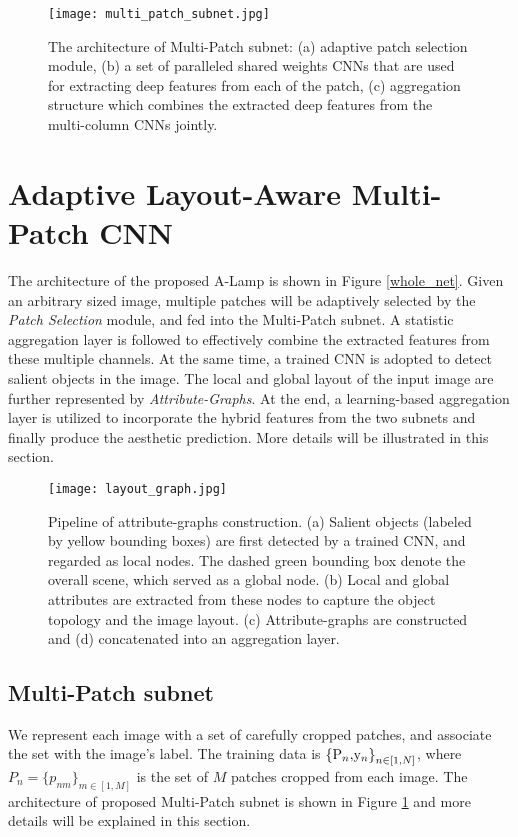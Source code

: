 \documentclass[10pt,twocolumn,letterpaper]{article}
\begin{document}
\begin{figure}
		\centering
		\texttt{[image: multi\_patch\_subnet.jpg]}
		\caption{The architecture of Multi-Patch subnet: (a) adaptive patch selection module, (b) a set of paralleled shared weights CNNs that are used for extracting deep features from each of the patch, (c) aggregation structure which combines the extracted deep features from the multi-column CNNs jointly.}
		\label{multi_patch}
		\vspace{-3mm}
	\end{figure} 
\section{Adaptive Layout-Aware Multi-Patch CNN}
	The architecture of the proposed A-Lamp is shown in Figure \ref{whole_net}. Given an arbitrary sized image, multiple patches will be adaptively selected by the \textit{Patch Selection} module, and fed into the Multi-Patch subnet. A statistic aggregation layer is followed to effectively combine the extracted features from these multiple channels.
	At the same time, a trained CNN is adopted to detect salient objects in the image. The local and global layout of the input image are further represented by \textit{Attribute-Graphs}. At the end, a learning-based aggregation layer is utilized to incorporate the hybrid features from the two subnets and finally produce the aesthetic prediction. More details will be illustrated in this section. 
	\begin{figure*}
		\centering
		\texttt{[image: layout\_graph.jpg]}
		\caption{Pipeline of attribute-graphs construction. (a) Salient objects (labeled by yellow bounding boxes) are first detected by a trained CNN, and regarded as local nodes. The dashed green bounding box denote the overall scene, which served as a global node. (b) Local and global attributes are extracted from these nodes to capture the object topology and the image layout. (c) Attribute-graphs are constructed and (d) concatenated into an aggregation layer.}
		\label{layout}
		\vspace{-3mm}
	\end{figure*}
	
	\subsection{Multi-Patch subnet}
	We represent each image with a set of carefully cropped patches, and associate the set with the image's label.
	The training data is ${{\rm{\{ }}{{\rm{P}}_n}{\rm{, }}{{\rm{y}}_n}{\rm{\} }}_{n \in [1,N]}}$, where ${P_n} = {\{ {p_{nm}}\} _{m \in [1,M]}}$ is the set of $M$ patches cropped from each image. The architecture of proposed Multi-Patch subnet is shown in Figure \ref{multi_patch} and more details will be explained in this section. 
	
\end{document}
